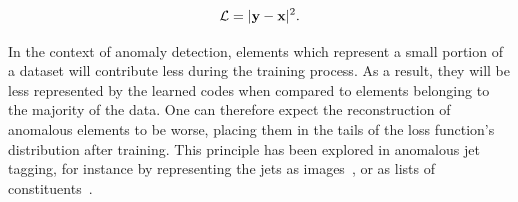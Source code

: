 \documentclass[11pt, a4paper]{article}
\begin{document}
\begin{equation}
\mathcal{L}=|{\textbf y} - {\textbf x}|^2.
\end{equation}

In the context of anomaly detection, elements which represent a small portion of a dataset will contribute less during the training process. 
As a result, they will be less represented by the learned codes when compared to elements belonging to the majority of the data. 
One can therefore expect the reconstruction of anomalous elements to be worse, placing them in the
tails of the loss function's distribution after training. 
This principle has been explored in anomalous jet tagging, for instance by representing the jets as images~\cite{Farina_2020}, or as lists 
of constituents~\cite{Heimel_2019}.

\begin{figure}[H]
  \begin{center}
  
    \def\layersep{2.5cm}
    
\end{center}
\end{figure}
\end{document}

